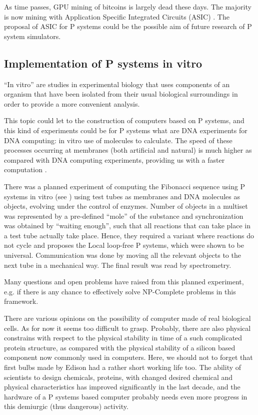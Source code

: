 As time passes, GPU mining of bitcoins is largely dead these days. The majority is now mining with Application Specific Integrated Circuits (ASIC) \cite{Smith08ASIC}. The proposal of ASIC for P systems could be the possible aim of future research of P system simulators. 


\subsection{Implementation of P systems in vitro} %
\label{sub:implementation_of_p_systems_in_vitro}

``In vitro'' are studies in experimental biology that uses components of an organism that have been isolated from their usual biological surroundings in order to provide a more convenient analysis.

This topic could let to the construction of computers based on P systems, and this kind of experiments could be for P systems what are DNA experiments for DNA computing: in vitro use of molecules to calculate. The speed of these processes occurring at membranes (both artificial and natural) is much higher as compared with DNA computing experiments, providing us with a faster computation \cite{Ardelean06InVitro}.

There was a planned experiment of computing the Fibonacci sequence using P systems in vitro (see \cite{Gershoni:2008:InVitro}) using test tubes as membranes and DNA molecules as objects, evolving under the control of enzymes. Number of objects in a multiset was represented by a pre-defined ``mole'' of the substance and synchronization was obtained by ``waiting enough'', such that all reactions that can take place in a test tube actually take place. Hence, they required a variant where reactions do not cycle and proposes the  Local loop-free P systems, which were shown to be universal. Communication was done by moving all the relevant objects to the next tube in a mechanical way. The final result was read by spectrometry.

Many questions and open problems have raised from this planned experiment, e.g. if there is any chance to effectively solve NP-Complete problems in this framework. 

There are various opinions on the possibility of computer made of real biological cells. As for now it seems too difficult to grasp. Probably, there are also physical constrains with respect to the physical stability in time of a such complicated protein structure, as compared with the physical stability of a silicon based component now commonly used in computers. Here, we should not to forget that first bulbs made by Edison had a rather short working life too. The ability of scientists to design chemicals, proteins, with changed desired chemical and physical characteristics has improved significantly in the last decade, and the hardware of a P systems based computer probably needs even more progress in this demiurgic (thus dangerous) activity.

